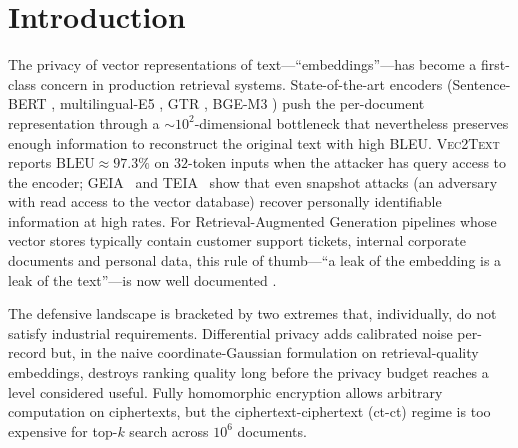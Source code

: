 \documentclass[11pt,a4paper]{article}
\begin{document}
\section{Introduction}

The privacy of vector representations of text---``embeddings''---has become
a first-class concern in production retrieval systems. State-of-the-art
encoders (Sentence-BERT \cite{ref_sbert}, multilingual-E5 \cite{ref_e5},
GTR \cite{ref_gtr}, BGE-M3 \cite{ref_bgem3}) push the per-document
representation through a
$\sim 10^2$-dimensional bottleneck that nevertheless preserves enough
information to reconstruct the original text with high BLEU.
\textsc{Vec2Text} \cite{ref_vec2text} reports
$\mathrm{BLEU} \approx 97.3\%$ on $32$-token inputs when the attacker has
query access to the encoder; \textsc{GEIA}~\cite{ref_geia} and
\textsc{TEIA}~\cite{ref_teia} show that even snapshot attacks
(an adversary with read access to the vector database) recover personally
identifiable information at high rates. For Retrieval-Augmented Generation
pipelines whose vector stores typically contain customer support tickets,
internal corporate documents and personal data, this rule of thumb---``a
leak of the embedding is a leak of the text''---is now well documented
\cite{ref_zeng_rag}.

The defensive landscape is bracketed by two extremes that, individually,
do not satisfy industrial requirements. Differential privacy
\cite{ref_dwork,ref_dpsgd} adds calibrated noise per-record but, in the
naive coordinate-Gaussian formulation on retrieval-quality embeddings,
destroys ranking quality long before the privacy budget reaches a level
considered useful. Fully homomorphic encryption \cite{ref_ckks,ref_openfhe}
allows arbitrary computation on ciphertexts, but the
ciphertext-ciphertext (ct-ct) regime is too expensive for top-$k$ search
across $10^6$ documents.
\end{document}
